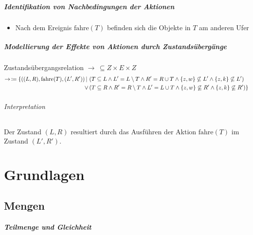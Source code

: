 			\paragraph{\textit{Identifikation} von Nachbedingungen der Aktionen}
				\begin{itemize}
					\item Nach dem Ereignis $ \text{fahre}(T) $ befinden sich die Objekte in $ T $ am anderen Ufer
				\end{itemize}

			\paragraph{\textit{Modellierung} der Effekte von Aktionen durch Zustandsübergänge}
				Zustandsübergangsrelation $ \rightarrow\, \subseteq Z \times E \times Z $
				\begin{align*}
					\rightarrow\, \coloneqq \{ ((L, R), \text{fahre}(T), (L', R'))\,\vert\, & \, (T \subseteq L \land L' = L \setminus T \land R' = R \cup T \land \{ z, w \} \not\subseteq L' \land \{ z, k \} \not\subseteq L')    \\
					\lor                                                                    & \, (T \subseteq R \land R' = R \setminus T \land L' = L \cup T \land \{ z, w \} \not\subseteq R' \land \{ z, k \} \not\subseteq R') \}
				\end{align*}

				\subparagraph{Interpretation}
					Der Zustand $ (L, R) $ resultiert durch das Ausführen der Aktion $ \text{fahre}(T) $ im Zustand $ (L', R') $.


\chapter{Grundlagen}

	\section{Mengen}
		\paragraph{Teilmenge und Gleichheit}

